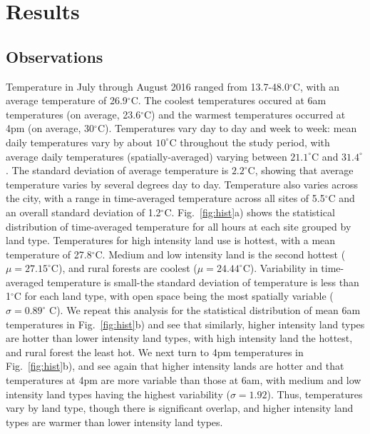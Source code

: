\section{Results}\label{sec:results} 
\subsection{Observations}
Temperature in July through August 2016 ranged from 13.7-48.0$^\circ$C, with an average temperature of 26.9$^\circ$C. The coolest temperatures occured at 6am temperatures (on average, 23.6$^\circ$C) and the warmest temperatures occurred at 4pm (on average,  30$^\circ$C). 
Temperatures vary day to day and week to week: mean daily temperatures vary by about $10^\circ$C throughout the study period, with average daily temperatures (spatially-averaged) varying between $21.1^\circ$C and $31.4^\circ$. The standard deviation of average temperature is $2.2^\circ$C, showing that average temperature varies by several degrees day to day. 
Temperature also varies across the city, with a range in time-averaged temperature across all sites of 5.5$^\circ$C and an overall standard deviation of 1.2$^\circ$C. Fig.~\ref{fig:hist}a) shows the statistical distribution of time-averaged temperature for all hours at each site grouped by land type. 
Temperatures %
for high intensity land use is hottest, with a mean temperature of 27.8$^\circ$C. Medium and low intensity land is the second hottest ($\mu = 27.15^\circ$C), and rural forests are coolest ($\mu = 24.44^\circ$C). 
Variability in time-averaged temperature is small-the standard deviation of temperature is less than 1$^\circ$C for each land type, with open space being the most spatially variable ($\sigma = 0.89^\circ$ C). We repeat this analysis for the statistical distribution of mean 6am temperatures in Fig.~\ref{fig:hist}b) and see that similarly, higher intensity land types are hotter than lower intensity land types, with high intensity land the hottest, and rural forest the least hot. We next turn to 4pm temperatures in Fig.~\ref{fig:hist}b), and see again that higher intensity lands are hotter and that temperatures at 4pm are more variable than those at 6am, with medium and low intensity land types having the highest variability ($\sigma = 1.92$). 
Thus, temperatures vary by land type, though there is significant overlap, and higher intensity land types are warmer than lower intensity land types. 

